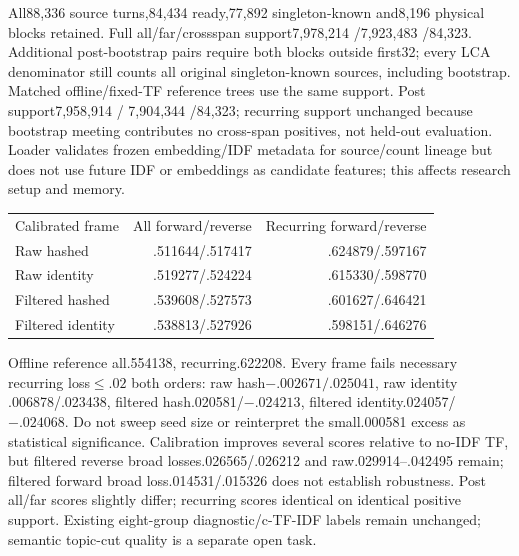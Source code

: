 \documentclass[11pt]{article}
\begin{document}
All88,336 source turns,84,434 ready,77,892 singleton-known and8,196 physical blocks
retained. Full all/far/crossspan support7,978,214 /7,923,483 /84,323. Additional
post-bootstrap pairs require both blocks outside first32; every LCA denominator
still counts all original singleton-known sources, including bootstrap. Matched
offline/fixed-TF reference trees use the same support. Post support7,958,914 /
7,904,344 /84,323; recurring support unchanged because bootstrap meeting contributes
no cross-span positives, not held-out evaluation. Loader validates frozen
embedding/IDF metadata for source/count lineage but does not use future IDF or
embeddings as candidate features; this affects research setup and memory.

\begin{center}\begin{tabular}{lrr}
Calibrated frame & All forward/reverse & Recurring forward/reverse \\
Raw hashed & .511644/.517417 & .624879/.597167 \\
Raw identity & .519277/.524224 & .615330/.598770 \\
Filtered hashed & .539608/.527573 & .601627/.646421 \\
Filtered identity & .538813/.527926 & .598151/.646276
\end{tabular}\end{center}
Offline reference all.554138, recurring.622208. Every frame fails necessary
recurring loss$\leq.02$ both orders: raw hash$-.002671/.025041$, raw identity
.006878/.023438, filtered hash.020581/$-.024213$, filtered identity.024057/$-.024068$.
Do not sweep seed size or reinterpret the small.000581 excess as statistical
significance. Calibration improves several scores relative to no-IDF TF, but
filtered reverse broad losses.026565/.026212 and raw.029914--.042495 remain;
filtered forward broad loss.014531/.015326 does not establish robustness.
Post all/far scores slightly differ; recurring scores identical on identical
positive support. Existing eight-group diagnostic/c-TF-IDF labels\cite{bertopic}
remain unchanged; semantic topic-cut quality is a separate open task.
\end{document}
